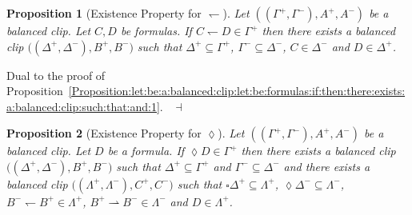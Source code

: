 \documentclass[draft]{article}
\newtheorem{proposition}{Proposition}
\newenvironment{proof}{{\bf Proof:}}{~$\dashv$\\}
\begin{document}
%
%
\begin{proposition}[Existence Property for $\leftharpoondown$]\label{Proposition:let:be:a:balanced:clip:let:be:formulas:if:then:there:exists:a:balanced:clip:such:that:and:2}
%
%
Let $((\Gamma^{+},\Gamma^{-}),A^{+},A^{-})$ be a balanced clip.
Let $C,D$ be formulas.
If $C{\leftharpoondown}D{\in}\Gamma^{+}$ then there exists a balanced clip $((\Delta^{+},\Delta^{-}),
%
%
%
%
%
%
%
$\linebreak$
%
%
%
%
%
%
B^{+},B^{-})$ such that $\Delta^{+}{\subseteq}\Gamma^{+}$, $\Gamma^{-}{\subseteq}\Delta^{-}$, $C{\in}\Delta^{-}$ and $D{\in}\Delta^{+}$.
%
%
\end{proposition}
%
%
\begin{proof}
%
%
Dual to the proof of Proposition~\ref{Proposition:let:be:a:balanced:clip:let:be:formulas:if:then:there:exists:a:balanced:clip:such:that:and:1}.
%
%
\medskip
%
%
\end{proof}
%
%
%
%
%
%
%
%
\begin{proposition}[Existence Property for $\lozenge$]\label{Proposition:let:be:a:balanced:clip:let:be:a:formula:if:then:for:all:balanced:clips:if:and:then:there:exists:a:balanced:clip:such:that:and:1:lozenge:Gamma:plus}
%
%
Let $((\Gamma^{+},\Gamma^{-}),A^{+},A^{-})$ be a balanced clip.
Let $D$ be a formula.
If ${\lozenge}D{\in}\Gamma^{+}$ then there exists a balanced clip $((\Delta^{+},\Delta^{-}),B^{+},
%
%
%
%
%
%
%
$\linebreak$
%
%
%
%
%
%
B^{-})$ such that $\Delta^{+}{\subseteq}\Gamma^{+}$ and $\Gamma^{-}{\subseteq}\Delta^{-}$ and there exists a balanced clip $((\Lambda^{+},\Lambda^{-}),C^{+},
%
%
%
%
%
%
%
$\linebreak$
%
%
%
%
%
%
C^{-})$ such that ${\square}\Delta^{+}{\subseteq}\Lambda^{+}$, ${\lozenge}\Delta^{-}{\subseteq}\Lambda^{-}$, $B^{-}{\leftharpoondown}B^{+}{\in}\Lambda^{+}$, $B^{+}{\rightharpoonup}B^{-}{\in}\Lambda^{-}$ and $D{\in}\Lambda^{+}$.
%
%
\end{proposition}
%
\end{document}
